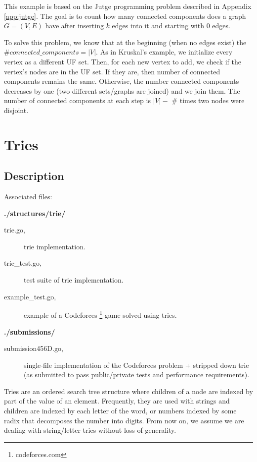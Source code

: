 \documentclass[a4paper,10pt,table,xcdraw]{article}
\begin{document}
This example is based on the Jutge programming problem described in Appendix \ref{app:jutge}. The goal is to count how many connected components does a graph $G = (V, E)$ have after inserting $k$ edges into it and starting with 0 edges.

To solve this problem, we know that at the beginning (when no edges exist) the $\# connected\_components = | V | $. As in Kruskal's example, we initialize every vertex as a different UF set. Then, for each new vertex to add, we check if the vertex's nodes are in the UF set. If they are, then number of connected components remains the same. Otherwise, the number connected components decreases by one (two different sets/graphs are joined) and we join them. The number of connected components at each step is $ |V| - $ \# times two nodes were disjoint.



\section{Tries}
\label{sec:tries}

\subsection{Description}

Associated files:

\textbf{./structures/trie/}
\begin{description}
\item [\hspace{10mm} trie.go,] trie implementation.
\item [\hspace{10mm} trie\_test.go,] test suite of trie implementation.
\item [\hspace{10mm} example\_test.go,] example of a Codeforces \footnote{codeforces.com} game solved using tries.
\end{description}
\textbf{./submissions/}
\begin{description}
\item [\hspace{10mm} submission456D.go,] single-file implementation of the Codeforces problem + stripped down trie (as submitted to pass public/private tests and performance requirements). 
\end{description}


Tries are an ordered search tree structure where children of a node are indexed by part of the value of an element. Frequently, they are used with strings and children are indexed by each letter of the word, or numbers indexed by some radix that decomposes the number into digits. From now on, we assume we are dealing with string/letter tries without loss of generality. 
\end{document}
